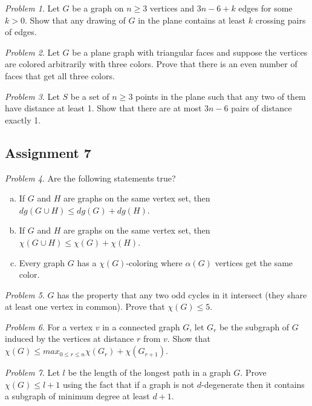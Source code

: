 \documentclass[10pt, fleqn, a4paper, landscape]{article}
\theoremstyle{plain} %
\theoremstyle{remark} %
\newtheorem{problem}{Problem}
\theoremstyle{definition} %
\begin{document}
\begin{multicols}{3}
\begin{tiny}
\begin{problem}
Let $G$ be a graph on $n\ge 3$ vertices and $3n- 6 + k$ edges for some $k > 0$. Show that any drawing of $G$ in the plane contains at least $k$ crossing pairs of edges.
\end{problem}

\begin{problem}
Let $G$ be a plane graph with triangular faces and suppose the vertices are colored arbitrarily with three colors. Prove that there is an even number of faces that get all three colors.
\end{problem}

\begin{problem}
Let $S$ be a set of $n\ge 3$ points in the plane such that any two of them have distance at least 1. Show that there are at most $3n - 6$ pairs of distance exactly 1.
\end{problem}

\subsection{Assignment 7}

\begin{problem}
Are the following statements true?
\begin{enumerate}[(a)]
\item If $G$ and $H$ are graphs on the same vertex set, then $dg(G \cup H)\le dg(G) + dg(H)$.
\item If $G$ and $H$ are graphs on the same vertex set, then $\chi(G \cup H) \le \chi(G) + \chi(H)$.
\item Every graph $G$ has a $\chi(G)$-coloring where $\alpha(G)$ vertices get the same color.
\end{enumerate}
\end{problem}

\begin{problem}
$G$ has the property that any two odd cycles in it intersect (they share at least one vertex in common). Prove that $\chi(G) \le 5.$
\end{problem}

\begin{problem}
For a vertex $v$ in a connected graph $G$, let $G_r$ be the subgraph of $G$ induced by the vertices at distance $r$ from $v$. Show that $\chi(G) \le max_{0\le r\le n}\chi(G_r) + \chi(G_{r+1})$.
\end{problem}

\begin{problem}
Let $l$ be the length of the longest path in a graph $G$. Prove $\chi(G)\le l + 1$ using the fact that if a graph is not $d$-degenerate then it contains a subgraph of minimum degree at least $d + 1$.
\end{problem}


\end{tiny}
\end{multicols}
\end{document}
